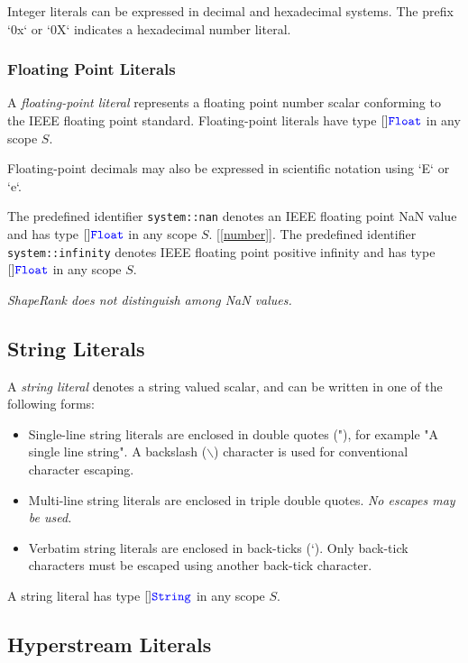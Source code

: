 \documentclass{article}
\begin{document}
Integer literals can be expressed in decimal and hexadecimal systems. The prefix `0x` or `0X` indicates a hexadecimal number literal. 

\subsubsection{Floating Point Literals}
\label{floatingPointLiterals}

A {\em floating-point literal} represents a floating point number scalar conforming to the IEEE floating point standard. Floating-point literals have type $[]\texttt{\color{blue} Float}{}$ in any scope $S$.

Floating-point decimals may also be expressed in scientific notation using `E` or `e`.

The predefined identifier {\tt system::nan}  denotes an IEEE floating point NaN value and has type $[]\texttt{\color{blue} Float}{}$ in any scope $S$. 
[\ref{number}].
The predefined identifier {\tt system::infinity} denotes IEEE floating point positive infinity and has type $[]\texttt{\color{blue} Float}{}$ in any scope $S$.

{\em
ShapeRank does not distinguish among NaN values.
}


\subsection{String Literals}
\label{stringLiterals}

A {\em string literal} denotes a string valued scalar, and can be written in one of the following forms:

\StringLiteral{}

\begin{itemize}
\item
Single-line string literals are enclosed in double quotes (\textsf{"}), for example \textsf{"}A single line string\textsf{"}. A backslash ($\backslash$) character is used for conventional character escaping.
\item Multi-line string literals are enclosed in triple double quotes.  {\em No escapes may be used.}
\item Verbatim string literals are enclosed in back-ticks (`). Only back-tick characters must be escaped using another back-tick character.
\end{itemize}

A string literal has type $[]\texttt{\color{blue} String}$ in any scope $S$.

\subsection{Hyperstream Literals}
\label{hyperstreamLiterals}
\end{document}
